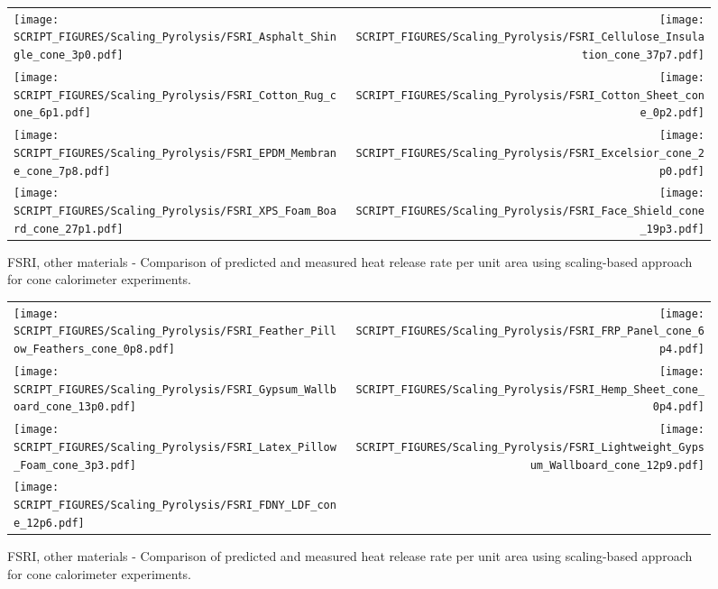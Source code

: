 \begin{figure}[p]
\begin{tabular*}{\textwidth}{l@{\extracolsep{\fill}}r}
\texttt{[image: SCRIPT\_FIGURES/Scaling\_Pyrolysis/FSRI\_Asphalt\_Shingle\_cone\_3p0.pdf]} &
\texttt{[image: SCRIPT\_FIGURES/Scaling\_Pyrolysis/FSRI\_Cellulose\_Insulation\_cone\_37p7.pdf]} \\
\texttt{[image: SCRIPT\_FIGURES/Scaling\_Pyrolysis/FSRI\_Cotton\_Rug\_cone\_6p1.pdf]} &
\texttt{[image: SCRIPT\_FIGURES/Scaling\_Pyrolysis/FSRI\_Cotton\_Sheet\_cone\_0p2.pdf]} \\
\texttt{[image: SCRIPT\_FIGURES/Scaling\_Pyrolysis/FSRI\_EPDM\_Membrane\_cone\_7p8.pdf]} &
\texttt{[image: SCRIPT\_FIGURES/Scaling\_Pyrolysis/FSRI\_Excelsior\_cone\_2p0.pdf]} \\
\texttt{[image: SCRIPT\_FIGURES/Scaling\_Pyrolysis/FSRI\_XPS\_Foam\_Board\_cone\_27p1.pdf]} &
\texttt{[image: SCRIPT\_FIGURES/Scaling\_Pyrolysis/FSRI\_Face\_Shield\_cone\_19p3.pdf]} \\
\end{tabular*}
\caption[HRRPUA of FSRI Materials using scaling model, other materials]
{FSRI, other materials - Comparison of predicted and measured heat release rate per unit area using scaling-based approach for cone calorimeter experiments.}
\label{FSRI_Materials_HRR_Others1}
\end{figure}

\begin{figure}[p]
\begin{tabular*}{\textwidth}{l@{\extracolsep{\fill}}r}
\texttt{[image: SCRIPT\_FIGURES/Scaling\_Pyrolysis/FSRI\_Feather\_Pillow\_Feathers\_cone\_0p8.pdf]} &
\texttt{[image: SCRIPT\_FIGURES/Scaling\_Pyrolysis/FSRI\_FRP\_Panel\_cone\_6p4.pdf]} \\
\texttt{[image: SCRIPT\_FIGURES/Scaling\_Pyrolysis/FSRI\_Gypsum\_Wallboard\_cone\_13p0.pdf]} &
\texttt{[image: SCRIPT\_FIGURES/Scaling\_Pyrolysis/FSRI\_Hemp\_Sheet\_cone\_0p4.pdf]} \\
\texttt{[image: SCRIPT\_FIGURES/Scaling\_Pyrolysis/FSRI\_Latex\_Pillow\_Foam\_cone\_3p3.pdf]} &
\texttt{[image: SCRIPT\_FIGURES/Scaling\_Pyrolysis/FSRI\_Lightweight\_Gypsum\_Wallboard\_cone\_12p9.pdf]}\\
\texttt{[image: SCRIPT\_FIGURES/Scaling\_Pyrolysis/FSRI\_FDNY\_LDF\_cone\_12p6.pdf]} \\
\end{tabular*}
\caption[HRRPUA of FSRI Materials using scaling model, others materials]
{FSRI, other materials - Comparison of predicted and measured heat release rate per unit area using scaling-based approach for cone calorimeter experiments.}
\label{FSRI_Materials_HRR_Others2}
\end{figure}

